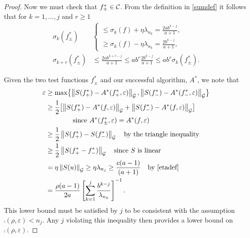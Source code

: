 \documentclass[final]{elsarticle}
\theoremstyle{definition}
\theoremstyle{remark}
\begin{document}
\begin{proof}
Now we must check that $f^*_\pm \in \cc$. From the definition in \eqref{sumdef} it follows that for $k = 1, \ldots, j$ and $r \ge 1$
\begin{align*}
\sigma_k(f^*_\pm) & \begin{cases} 
\displaystyle
\le \sigma_k(f) + \eta \lambda_{n_k} = \frac{2a b^{k-j}}{a+1}, 
\\[1ex]
\displaystyle
\ge \sigma_k(f) - \eta \lambda_{n_k}  = \frac{2 b^{k-j}}{a+1}, 
\end{cases}
\\
\sigma_{k+r}(f^*_\pm) & 
\le \frac{2a b^{k+r-j}}{a+1} \le ab^r \frac{2 b^{k-j}}{a+1} \le a b^r \sigma_{k}(f^*_\pm).
\end{align*}

Given the two test functions $f^*_\pm$ and our successful algorithm, $A^*$, we note that
\begin{align*}
\varepsilon &\ge \max \bigl\{\norm[\cg]{S(f^*_+) - A^*(f^*_+,\varepsilon)}, \norm[\cg]{S(f^*_-) - A^*(f^*_-,\varepsilon)} \bigr\} \\
&\ge \frac 12 \bigl[\norm[\cg]{S(f^*_+) - A^*(f,\varepsilon)} + \norm[\cg]{S(f^*_-) - A^*(f,\varepsilon)}  \bigr] \\
&\qquad \qquad \text{since } A^*(f^*_\pm,\varepsilon) = A^*(f,\varepsilon) \\
&\ge \frac 12 \norm[\cg]{S(f^*_+) - S(f^*_-)} \quad \text{by the triangle inequality}\\
&\ge \frac 12 \norm[\cg]{S(f^*_+ - f^*_-)} \quad \text{since $S$ is linear}\\
&= \eta \norm[\cg]{S(u)} \ge \eta \lambda_{n_j} \ge \frac {c(a-1)}{(a+1)} \quad \text{by \eqref{etadef}} \\
& = \frac{\rho(a-1)}{2a} \left[\sum_{k=1}^j \frac{b^{k-j}}{\lambda_{n_{k}}} \right]^{-1}.
\end{align*}
This lower bound must be satisfied by $j$ to be consistent with the assumption $\comp(\rho,\varepsilon) < n_j$.  Any $j$ violating this inequality then provides a lower bound on $\comp(\rho,\varepsilon)$.
\end{proof}
\end{document}
